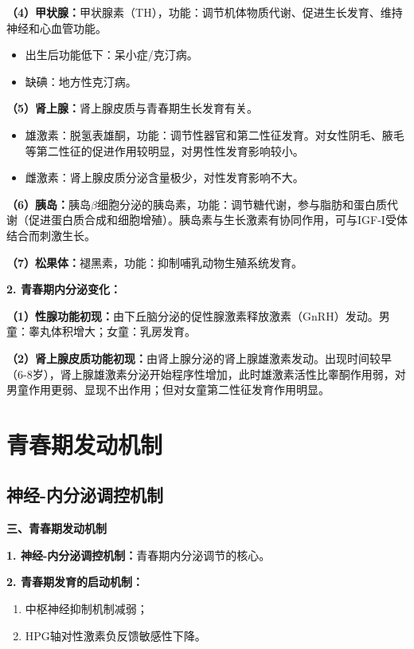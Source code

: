 \begin{keybox}
\textbf{（4）甲状腺：}甲状腺素（TH），功能：调节机体物质代谢、促进生长发育、维持神经和心血管功能。
\begin{itemize}[leftmargin=*]
    \item 出生后功能低下：呆小症/克汀病。
    \item 缺碘：地方性克汀病。
\end{itemize}

\textbf{（5）肾上腺：}肾上腺皮质与青春期生长发育有关。
\begin{itemize}[leftmargin=*]
    \item 雄激素：脱氢表雄酮，功能：调节性器官和第二性征发育。对女性阴毛、腋毛等第二性征的促进作用较明显，对男性性发育影响较小。
    \item 雌激素：肾上腺皮质分泌含量极少，对性发育影响不大。
\end{itemize}

\textbf{（6）胰岛：}胰岛$\beta$细胞分泌的胰岛素，功能：调节糖代谢，参与脂肪和蛋白质代谢（促进蛋白质合成和细胞增殖）。胰岛素与生长激素有协同作用，可与IGF-I受体结合而刺激生长。

\textbf{（7）松果体：}褪黑素，功能：抑制哺乳动物生殖系统发育。

\textbf{2. 青春期内分泌变化：}

\textbf{（1）性腺功能初现：}由下丘脑分泌的促性腺激素释放激素（GnRH）发动。男童：睾丸体积增大；女童：乳房发育。

\textbf{（2）肾上腺皮质功能初现：}由肾上腺分泌的肾上腺雄激素发动。出现时间较早（6-8岁），肾上腺雄激素分泌开始程序性增加，此时雄激素活性比睾酮作用弱，对男童作用更弱、显现不出作用；但对女童第二性征发育作用明显。
\end{keybox}

\section{青春期发动机制}

\subsection{神经-内分泌调控机制}

\begin{keybox}
\textbf{三、青春期发动机制}

\textbf{1. 神经-内分泌调控机制：}青春期内分泌调节的核心。

\textbf{2. 青春期发育的启动机制：}
\begin{enumerate}[leftmargin=*]
    \item 中枢神经抑制机制减弱；
    \item HPG轴对性激素负反馈敏感性下降。
\end{enumerate}
\end{keybox}

